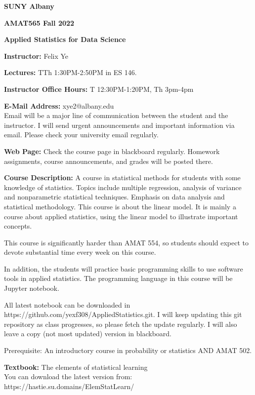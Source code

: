 \documentclass[a4paper,10pt]{article}
\begin{document}
\begin{center}

\textbf{SUNY Albany}

\textbf{AMAT565 Fall 2022}

\textbf{Applied Statistics for Data Science}


\end{center}

\textbf{Instructor:} Felix Ye 

\textbf{Lectures:} TTh 1:30PM-2:50PM  in ES 146.

\textbf{Instructor Office Hours:}  T 12:30PM-1:20PM, Th 3pm-4pm


\textbf{E-Mail Address:} xye2@albany.edu\\
Email will be a major line of communication between the student and the instructor. I will send urgent announcements and important information via email. Please check your university email regularly.

\textbf{Web Page:}
Check the course page in blackboard regularly. Homework assignments, course announcements, and grades will be posted there.


\textbf{Course Description:} 	
A course in statistical methods for students with some knowledge of statistics. Topics include multiple regression, analysis of variance and nonparametric statistical techniques. Emphasis on data analysis and statistical methodology.  
This course is about the linear model. It is mainly a course about applied statistics, using the linear model to illustrate important concepts.

This course is significantly harder than AMAT 554, so students should expect to devote substantial time every week on this course. 

In addition, the students will practice basic programming skills to use software tools in applied statistics. The programming language in this course will be Jupyter notebook. 

All latest notebook can be downloaded in https://github.com/yexf308/AppliedStatistics.git. I will keep updating this git repository as class progresses, so please fetch the update regularly. I will also leave a copy (not most updated) version in blackboard. 

 Prerequisite: An introductory course in probability or statistics AND AMAT 502.
 

\textbf{Textbook:} 
The elements of statistical learning \\
You can download the latest version from: https://hastie.su.domains/ElemStatLearn/
\end{document}
